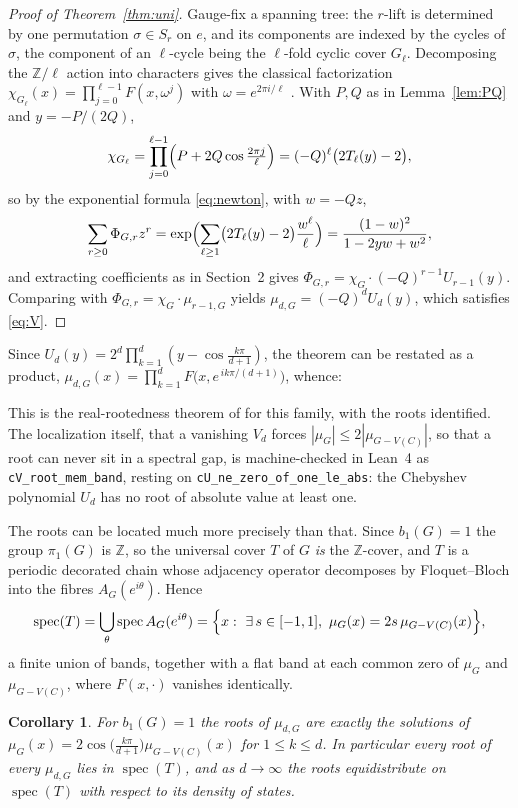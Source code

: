 \documentclass[11pt]{article}
\newtheorem{corollary}[theorem]{Corollary}
\theoremstyle{remark}
\begin{document}
\begin{proof}[Proof of Theorem~\ref{thm:uni}]
Gauge-fix a spanning tree: the $r$-lift is determined by one permutation
$\sigma\in S_r$ on $e$, and its components are indexed by the cycles of
$\sigma$, the component of an $\ell$-cycle being the $\ell$-fold cyclic cover
$G_\ell$. Decomposing the $\mathbb{Z}/\ell$ action into characters gives the
classical factorization $\chi_{G_\ell}(x)=\prod_{j=0}^{\ell-1}F(x,\omega^j)$
with $\omega=e^{2\pi i/\ell}$ \cite{MS,DFMRS}. With $P,Q$ as in
Lemma~\ref{lem:PQ} and $y=-P/(2Q)$,
\[
\chi_{G_\ell}=\prod_{j=0}^{\ell-1}\Bigl(P+2Q\cos\tfrac{2\pi j}{\ell}\Bigr)
=(-Q)^{\ell}\bigl(2T_\ell(y)-2\bigr),
\]
so by the exponential formula \eqref{eq:newton}, with $w=-Qz$,
\[
\sum_{r\ge0}\Phi_{G,r}z^{r}
=\exp\Bigl(\sum_{\ell\ge1}\bigl(2T_\ell(y)-2\bigr)\frac{w^{\ell}}{\ell}\Bigr)
=\frac{(1-w)^2}{1-2yw+w^2},
\]
and extracting coefficients as in Section~2 gives
$\Phi_{G,r}=\chi_G\cdot(-Q)^{r-1}U_{r-1}(y)$. Comparing with
$\Phi_{G,r}=\chi_G\cdot\mu_{r-1,G}$ \cite{HPS} yields
$\mu_{d,G}=(-Q)^{d}U_d(y)$, which satisfies \eqref{eq:V}.
\end{proof}

Since $U_d(y)=2^{d}\prod_{k=1}^{d}(y-\cos\tfrac{k\pi}{d+1})$, the theorem can
be restated as a product,
$\mu_{d,G}(x)=\prod_{k=1}^{d}F\bigl(x,e^{\,ik\pi/(d+1)}\bigr)$, whence:



This is the real-rootedness theorem of \cite{HPS} for this family, with the
roots identified. The localization itself, that a vanishing $V_d$ forces
$|\mu_G|\le2|\mu_{G-V(C)}|$, so that a root can never sit in a spectral gap, is machine-checked in Lean~4 as \texttt{cV\_root\_mem\_band}, resting on
\texttt{cU\_ne\_zero\_of\_one\_le\_abs}: the Chebyshev polynomial $U_d$ has no
root of absolute value at least one.

The roots can be located much more precisely than that. Since $b_1(G)=1$ the
group $\pi_1(G)$ is $\mathbb{Z}$, so the universal cover $T$ of $G$ \emph{is}
the $\mathbb{Z}$-cover, and $T$ is a periodic decorated chain whose adjacency
operator decomposes by Floquet--Bloch into the fibres $A_G(e^{i\theta})$. Hence
\[
\operatorname{spec}(T)=\bigcup_{\theta}\operatorname{spec}A_G(e^{i\theta})
=\Bigl\{x:\ \exists\,s\in[-1,1],\ \mu_G(x)=2s\,\mu_{G-V(C)}(x)\Bigr\},
\]
a finite union of bands, together with a flat band at each common zero of
$\mu_G$ and $\mu_{G-V(C)}$, where $F(x,\cdot)$ vanishes identically.

\begin{corollary}\label{cor:floquet}
For $b_1(G)=1$ the roots of $\mu_{d,G}$ are exactly the solutions of
$\mu_G(x)=2\cos\!\bigl(\tfrac{k\pi}{d+1}\bigr)\mu_{G-V(C)}(x)$ for
$1\le k\le d$. In particular every root of every $\mu_{d,G}$ lies in
$\operatorname{spec}(T)$, and as $d\to\infty$ the roots equidistribute on
$\operatorname{spec}(T)$ with respect to its density of states.
\end{corollary}
\end{document}
